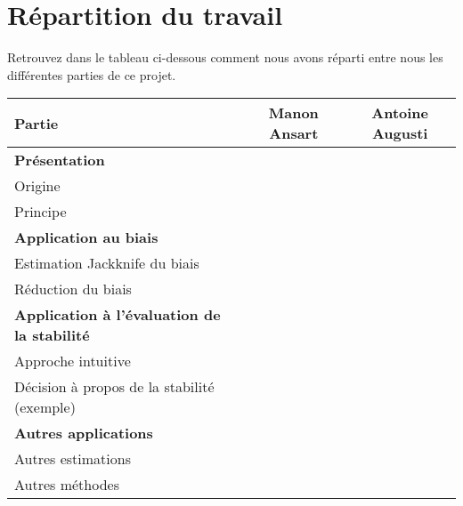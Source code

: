 \documentclass[a4paper,10pt]{article}
\newcommand{\hlineGras}{\Xhline{2\arrayrulewidth}}
\begin{document}
	\section{Répartition du travail}
	Retrouvez dans le tableau ci-dessous comment nous avons réparti entre nous les différentes parties de ce projet.

	\vspace{10px}
	\begin{center}
		\begin{tabular}
		{| l || c | c |} \hline
		Partie & Manon Ansart & Antoine Augusti \\ \hline \hline
		\textbf{Présentation} & & \\ \hline
		Origine & \checkmark & \checkmark \\ \hline
		Principe & \checkmark & \checkmark \\ \hline
		\hlineGras
		\textbf{Application au biais} & & \\ \hline
		Estimation Jackknife du biais  & & \checkmark  \\ \hline
		Réduction du biais & \checkmark &  \\ \hline
		\hlineGras
		\textbf{Application à l'évaluation de la stabilité} & & \\ \hline
		Approche intuitive  & & \checkmark \\ \hline
		Décision à propos de la stabilité (exemple)  & & \checkmark \\ \hline
		\hlineGras
		\textbf{Autres applications} & & \\ \hline
		Autres estimations  & \checkmark & \\ \hline
		Autres méthodes  & \checkmark & \\ \hline
		\end{tabular}
	\end{center}
\end{document}
